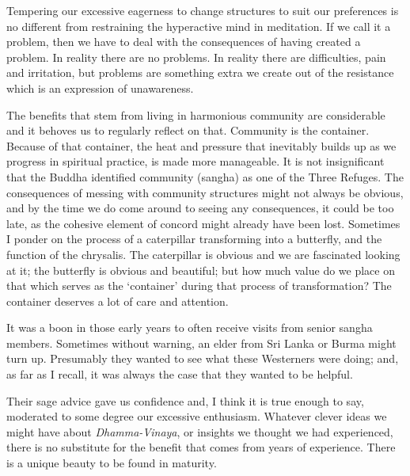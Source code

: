 Tempering our excessive eagerness to change structures to suit our
preferences is no different from restraining the hyperactive mind in
meditation. If we call it a problem, then we have to deal with the
consequences of having created a problem. In reality there are no
problems. In reality there are difficulties, pain and irritation, but
problems are something extra we create out of the resistance which is an
expression of unawareness.

The benefits that stem from living in harmonious community are
considerable and it behoves us to regularly reflect on that. Community
is the container. Because of that container, the heat and pressure that
inevitably builds up as we progress in spiritual practice, is made more
manageable. It is not insignificant that the Buddha identified community
(sangha) as one of the Three Refuges. The consequences of messing with
community structures might not always be obvious, and by the time we do
come around to seeing any consequences, it could be too late, as the
cohesive element of concord might already have been lost. Sometimes I
ponder on the process of a caterpillar transforming into a butterfly,
and the function of the chrysalis. The caterpillar is obvious and we are
fascinated looking at it; the butterfly is obvious and beautiful; but
how much value do we place on that which serves as the `container'
during that process of transformation? The container deserves a lot of
care and attention.

It was a boon in those early years to often receive visits from senior
sangha members. Sometimes without warning, an elder from Sri Lanka or
Burma might turn up. Presumably they wanted to see what these Westerners
were doing; and, as far as I recall, it was always the case that they
wanted to be helpful.

Their sage advice gave us confidence and, I think it is true enough to
say, moderated to some degree our excessive enthusiasm. Whatever clever ideas
we might have about \emph{Dhamma-Vinaya}, or insights we thought we had
experienced, there is no substitute for the benefit that comes from
years of experience. There is a unique beauty to be found in maturity.

\enlargethispage{\baselineskip}

